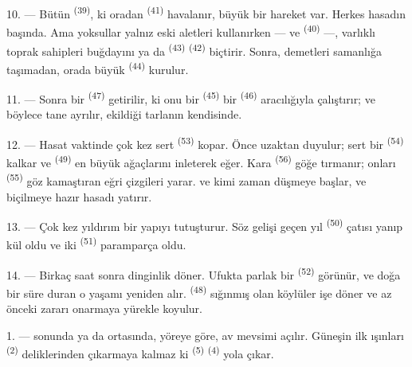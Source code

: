 10. --- Bütün  \textsuperscript{(39)}, ki oradan
 \textsuperscript{(41)} havalanır, büyük bir hareket
var. Herkes hasadın
başında. Ama yoksullar yalnız eski aletleri kullanırken ---
 ve  \textsuperscript{(40)} ---,
varlıklı toprak sahipleri buğdayını ya da 
\textsuperscript{(43)}  \textsuperscript{(42)} biçtirir.
Sonra, demetleri samanlığa taşımadan, orada büyük 
\textsuperscript{(44)} kurulur.

11. --- Sonra bir  \textsuperscript{(47)} getirilir, ki
onu bir  \textsuperscript{(45)} bir 
\textsuperscript{(46)} aracılığıyla çalıştırır; ve böylece tane
 ayrılır, ekildiği tarlanın kendisinde.

\VUsaut{5.0mm}
\VUsaut{3.4mm}

12. --- Hasat vaktinde çok kez sert  \textsuperscript{(53)}
kopar. Önce uzaktan  duyulur; sert bir 
\textsuperscript{(54)} kalkar ve  \textsuperscript{(49)} en
büyük ağaçlarını inleterek eğer. Kara 
\textsuperscript{(56)} göğe tırmanır; onları 
\textsuperscript{(55)} göz kamaştıran eğri çizgileri yarar.  ve
kimi zaman  düşmeye başlar, ve biçilmeye hazır hasadı yatırır.

13. --- Çok kez yıldırım bir yapıyı tutuşturur. Söz gelişi geçen yıl
 \textsuperscript{(50)} çatısı yanıp kül oldu ve iki
 \textsuperscript{(51)} paramparça oldu.

14. --- Birkaç saat sonra dinginlik döner. Ufukta parlak bir
 \textsuperscript{(52)} görünür, ve doğa bir süre duran o
yaşamı yeniden alır.  \textsuperscript{(48)} sığınmış olan
köylüler işe döner ve az önceki zararı onarmaya yürekle koyulur.

\VUsaut{6.0mm}
\VUsaut{3.6mm}

\VUsaut{1.4mm}
\VUsaut{4.0mm}

1. ---  sonunda ya da  ortasında, yöreye göre, av
mevsimi açılır. Güneşin ilk ışınları 
\textsuperscript{(2)} deliklerinden çıkarmaya kalmaz ki 
\textsuperscript{(5)}  \textsuperscript{(4)} yola çıkar.


